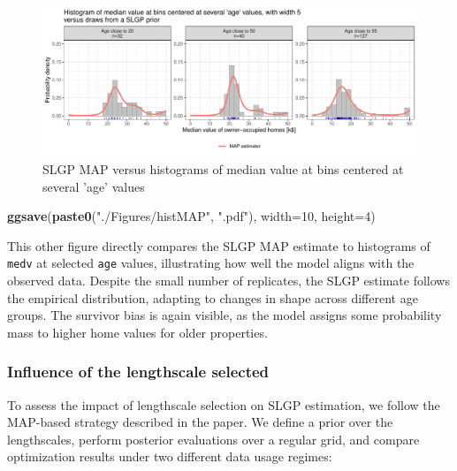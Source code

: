 \documentclass[
]{article}
\newenvironment{Shaded}{\begin{snugshade}}{\end{snugshade}}
\newcommand{\AttributeTok}[1]{\textcolor[rgb]{0.13,0.29,0.53}{#1}}
\newcommand{\DecValTok}[1]{\textcolor[rgb]{0.00,0.00,0.81}{#1}}
\newcommand{\FunctionTok}[1]{\textcolor[rgb]{0.13,0.29,0.53}{\textbf{#1}}}
\newcommand{\NormalTok}[1]{#1}
\newcommand{\StringTok}[1]{\textcolor[rgb]{0.31,0.60,0.02}{#1}}
\begin{document}
\begin{figure}[H]

{\centering \includegraphics{IntroductionSLGP_files/figure-latex/SLGPplottingMAP-1} 

}

\caption{SLGP MAP versus histograms of median value at bins centered at several 'age' values}\label{fig:SLGPplottingMAP}
\end{figure}

\begin{Shaded}
\begin{Highlighting}[]

\FunctionTok{ggsave}\NormalTok{(}\FunctionTok{paste0}\NormalTok{(}\StringTok{"./Figures/histMAP"}\NormalTok{,  }\StringTok{".pdf"}\NormalTok{), }\AttributeTok{width=}\DecValTok{10}\NormalTok{, }\AttributeTok{height=}\DecValTok{4}\NormalTok{)}
\end{Highlighting}
\end{Shaded}

This other figure directly compares the SLGP MAP estimate to histograms of \texttt{medv} at selected \texttt{age} values, illustrating how well the model aligns with the observed data. Despite the small number of replicates, the SLGP estimate follows the empirical distribution, adapting to changes in shape across different age groups. The survivor bias is again visible, as the model assigns some probability mass to higher home values for older properties.

\subsubsection{Influence of the lengthscale selected}\label{influence-of-the-lengthscale-selected}

To assess the impact of lengthscale selection on SLGP estimation, we follow the MAP-based strategy described in the paper. We define a prior over the lengthscales, perform posterior evaluations over a regular grid, and compare optimization results under two different data usage regimes:
\end{document}
